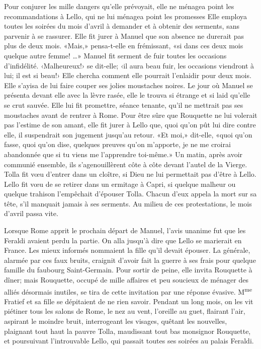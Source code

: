 Pour conjurer les mille dangers qu'elle prévoyait, elle ne ménagea point les recommandations à Lello, qui ne lui ménagea point les promesses Elle employa toutes les soirées du mois d'avril à demander et à obtenir des serments, sans parvenir à se rassurer. Elle fit jurer à Manuel que son absence ne durerait pas plus de deux mois. «Mais,» pensa-t-elle en frémissant, «si dans ces deux mois quelque autre femme! \ldots{}» Manuel fit serment de fuir toutes les occasions d'infidélité. ‹Malheureux!› se dit-elle; ‹il aura beau fuir, les occasions viendront à lui; il est si beau!› Elle chercha comment elle pourrait l'enlaidir pour deux mois. Elle s'ayisa de lui faire couper ses jolies moustaches noires. Le jour où Manuel se présenta devant elle avec la lèvre rasée, elle le trouva si étrange et si laid qu'elle se crut sauvée. Elle lui fit promettre, séance tenante, qu'il ne mettrait pas ses moustaches avant de rentrer à Rome. Pour être sûre que Rouquette ne lui volerait pas l'estime de son amant, elle fit jurer à Lello que, quoi qu'on pût lui dire contre elle, il suspendrait son jugement jusqu'au retour. «Et moi,» dit-elle, «quoi qu'on fasse, quoi qu'on dise, quelques preuves qu'on m'apporte, je ne me croirai abandonnée que si tu viens me l'apprendre toi-même.» Un matin, après avoir communié ensemble, ils s'agenouillèrent côte à côte devant l'autel de la Vierge. Tolla fit v\oe{}u d'entrer dans un cloître, si Dieu ne lui permettait pas d'être à Lello. Lello fit v\oe{}u de se retirer dans un ermitage à Capri, si quelque malheur ou quelque trahison l'empêchait d'épouser Tolla. Chacun d'eux appela la mort sur sa tête, s'il manquait jamais à ses serments. Au milieu de ces protestations, le mois d'avril passa vite.

Lorsque Rome apprit le prochain départ de Manuel, l'avis unanime fut que les Feraldi avaient perdu la partie. On alla jusqu'à dire que Lello se marierait en France. Les mieux informés nommaient la fille qu'il devait épouser. La générale, alarmée par ces faux bruits, craignit d'avoir fait la guerre à ses frais pour quelque famille du faubourg Saint-Germain. Pour sortir de peine, elle invita Rouquette à dîner; mais Rouquette, occupé de mille affaires et peu soucieux de ménager des alliés désormais inutiles, se tira de cette invitation par une réponse évasive. M\textsuperscript{me} Fratief et sa fille se dépitaient de ne rien savoir. Pendant un long mois, on les vit piétiner tous les salons de Rome, le nez au vent, l'oreille au guet, flairant l'air, aspirant le moindre bruit, interrogeant les visages, quêtant les nouvelles, plaignant tout haut la pauvre Tolla, maudissant tout bas monsignor Rouquette, et poursuivant l'introuvable Lello, qui passait toutes ses soirées au palais Feraldi.

